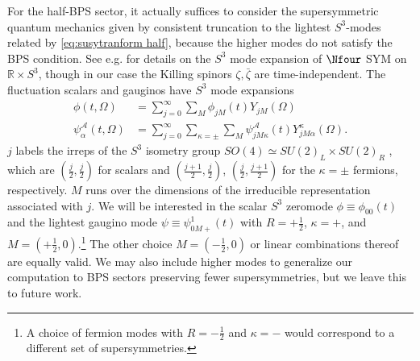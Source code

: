 \documentclass[a4paper,12pt]{article}
\begin{document}
For the half-BPS sector, it actually suffices to consider the supersymmetric quantum mechanics given by consistent truncation to the lightest $S^3$-modes related by \eqref{eq:susytranform half}, because the higher modes do not satisfy the BPS condition. See e.g. \cite{Ishiki:2006rt} for details on the $S^3$ mode expansion of $\Nfour$ SYM on $\mathbb{R} \times S^3$, though in our case the Killing spinors $\zeta, \bar\zeta$ are time-independent. The fluctuation scalars and gauginos have $S^3$ mode expansions
\begin{align}
    \phi(t,\Omega) &= \sum_{j=0}^\infty \sum_{M} \phi_{j M}(t) Y_{j M}(\Omega) \nonumber \\
    \psi^{\mathcal{A}}_\alpha(t,\Omega) &= \sum_{j=0}^\infty \sum_{\kappa = \pm} \sum_{M} \psi_{j M \kappa}^{\mathcal{A}}(t) Y_{j M \alpha}^{\kappa}(\Omega).
\end{align}
$j$ labels the irreps of the $S^3$ isometry group $SO(4) \simeq SU(2)_L \times SU(2)_R$ , which are $(\frac{j}{2},\frac{j}{2})$ for scalars and $(\frac{j+1}{2},\frac{j}{2})$, $(\frac{j}{2},\frac{j+1}{2})$ for the $\kappa = \pm$ fermions, respectively. $M$ runs over the dimensions of the irreducible representation associated with $j$. We will be interested in the scalar $S^3$ zeromode $\phi \equiv \phi_{00}(t)$ and the lightest gaugino mode $\psi \equiv \psi^{1}_{0M+}(t)$ with $R=+\frac{1}{2}$, $\kappa=+$, and $M=(+\frac{1}{2},0)$.\footnote{A choice of fermion modes with $R = -\frac{1}{2}$ and $\kappa=-$ would correspond to a different set of supersymmetries.} The other choice $M=(-\frac{1}{2},0)$ or linear combinations thereof are equally valid. We may also include higher modes to generalize our computation to BPS sectors preserving fewer supersymmetries, but we leave this to future work. 
\end{document}

